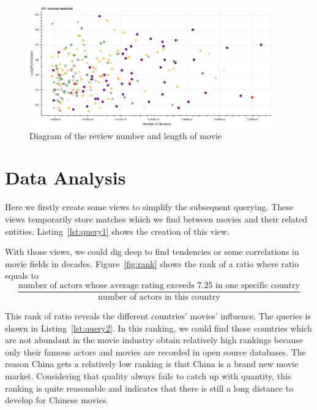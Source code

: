 \documentclass[a4paper]{article}
\begin{document}
\begin{figure}[H]
  \centering
  \includegraphics[width=300pt]{figures/review_length.png}
  \caption{Diagram of the review number and length of movie}
  \label{fig:review_length}
\end{figure}

\section{Data Analysis}
Here we firstly create some views to simplify the subsequent querying. These views temporarily store matches which we find between movies and their related entities. Listing~\ref{lst:query1} shows the creation of this view.

With those views, we could dig deep to find tendencies or some correlations in movie fields in decades. Figure~\ref{fig:rank}  shows the rank of a ratio where ratio equals to
\[
 \frac{\text{number of actors whose average rating exceeds 7.25 in one specific country}}{\text{number of actors in this country}}
\]

This rank of ratio reveals the different countries' movies' influence. The queries is shown in Listing~\ref{lst:query2}.
 In this ranking, we could find those countries which are not abundant in the movie industry obtain relatively high rankings because only their famous actors and movies are recorded in open source databases. The reason China gets a relatively low ranking is that China is a brand new movie market. Considering that quality always fails to catch up with quantity, this ranking is quite reasonable and indicates that there is still a long distance to develop for Chinese movies. \par
\end{document}
